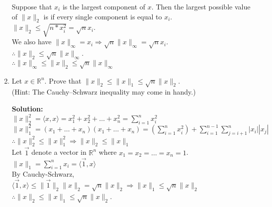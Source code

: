 \documentclass{article}
\newcommand{\solution}{\textbf{Solution: }}
\newcommand{\R}{\mathbb{R}}
\begin{document}
\begin{enumerate}[label=(\alph*)]
\begin{mdframed}
    Suppose that $x_i$ is the largest component of $x$. Then the largest possible value of $\lVert x \rVert_2$ is if every single component is equal to $x_i$.\\
    $\lVert x \rVert_2 \leq \sqrt{n*x_i^2}=\sqrt{n}x_i$.\\
    We also have $\lVert x \rVert_{\infty}=x_i \Rightarrow \sqrt{n}\lVert x \rVert_{\infty}=\sqrt{n}x_i$.\\
    $\therefore \lVert x \rVert_2 \leq \sqrt{n}\lVert x \rVert_{\infty}$.\\
    $\therefore   \lVert x \rVert_{\infty} \leq \lVert x\rVert_2 \leq \sqrt{n} \lVert x \rVert_{\infty}$
    \end{mdframed}
    
    \item Let $x \in \R^n$. Prove that $\lVert x \rVert_2 \leq \lVert x \rVert_1 \leq \sqrt{n} \lVert x \rVert_2$. \\
    (Hint: The Cauchy–Schwarz inequality may come in handy.)
    \begin{mdframed} \solution \\
    $\lVert x \rVert_2^2=\langle x, x \rangle=x_1^2+x_2^2+\dots+x_n^2=\sum_{i=1}^{n}x_i^2$\\
    $\lVert x \rVert_1^2=(x_1+\dots+x_n)(x_1+\dots+x_n)=
    (\sum_{i=1}^{n}x_i^2)+\sum_{i=1}^{n-1}\sum_{j=i+1}^{n}|x_i||x_j|$\\
    $\therefore \lVert x \rVert_2^2 \leq \lVert x \rVert_1^2 \Rightarrow \lVert x \rVert_2 \leq \lVert x \rVert_1$\\
    
    Let $\vec{1}$ denote a vector in $\R^n$ where $x_1=x_2=\dots=x_n=1$.\\
    $\lVert x \rVert_1=\sum_{i=1}^{n}x_i=\langle \vec{1}, x\rangle$\\
    By Cauchy-Schwarz, $\langle \vec{1}, x\rangle \leq \lVert \vec{1} \rVert_2 \lVert x \rVert_2 = \sqrt{n} \lVert x \rVert_2 \Rightarrow \lVert x \rVert_1 \leq \sqrt{n} \lVert x \rVert_2$\\
    
    $\therefore \lVert x \rVert_2 \leq \lVert x \rVert_1 \leq \sqrt{n} \lVert x \rVert_2$.
    
    \end{mdframed}
    
\end{enumerate}

\newpage
\end{document}
